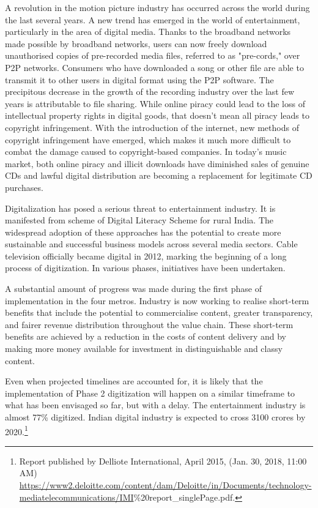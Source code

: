 \begin{multicols}{2}
\noi
A revolution in the motion picture industry has occurred across the world during the last
several years. A new trend has emerged in the world of entertainment, particularly in the area
of digital media. Thanks to the broadband networks made possible by broadband networks,
users can now freely download unauthorised copies of pre-recorded media files, referred to as
"pre-cords," over P2P networks. Consumers who have downloaded a song or other file are
able to transmit it to other users in digital format using the P2P software. The precipitous
decrease in the growth of the recording industry over the last few years is attributable to file
sharing. While online piracy could lead to the loss of intellectual property rights in digital
goods, that doesn't mean all piracy leads to copyright infringement. With the introduction of
the internet, new methods of copyright infringement have emerged, which makes it much
more difficult to combat the damage caused to copyright-based companies. In today's music
market, both online piracy and illicit downloads have diminished sales of genuine CDs and
lawful digital distribution are becoming a replacement for legitimate CD purchases.

\noi
Digitalization has posed a serious threat to entertainment industry. It is manifested from
scheme of Digital Literacy Scheme for rural India. The widespread adoption of these
approaches has the potential to create more sustainable and successful business models across
several media sectors. Cable television officially became digital in 2012, marking the
beginning of a long process of digitization. In various phases, initiatives have been
undertaken.

\noi
A substantial amount of progress was made during the first phase of implementation in the
four metros. Industry is now working to realise short-term benefits that include the potential
to commercialise content, greater transparency, and fairer revenue distribution throughout the
value chain. These short-term benefits are achieved by a reduction in the costs of content
delivery and by making more money available for investment in distinguishable and classy
content.

\noi
Even when projected timelines are accounted for, it is likely that the implementation of Phase
2 digitization will happen on a similar timeframe to what has been envisaged so far, but with a delay. The entertainment industry is almost 77\% digitized. Indian digital industry is expected to cross 3100 crores by 2020.\footnote{Report published by Delliote International, April 2015, (Jan. 30, 2018, 11:00 AM)  \url{https://www2.deloitte.com/content/dam/Deloitte/in/Documents/technology-mediatelecommunications/IMI}\%20report\_singlePage.pdf.}


\end{multicols}
